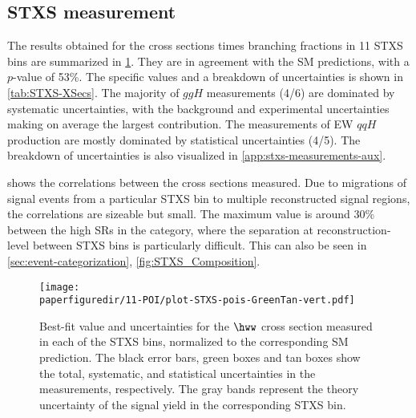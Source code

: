 \subsection{STXS measurement}
The results obtained for the cross sections times branching fractions in 11 STXS bins are summarized in \cref{fig:11-POI_measurement}. 
They are in agreement with the SM predictions, with a $p$-value of 53\%.
The specific values and a breakdown of uncertainties is shown in \cref{tab:STXS-XSecs}. 
The majority of $ggH$ measurements (4/6) are dominated by systematic uncertainties, with the background and experimental uncertainties making on average the largest contribution. 
The measurements of EW $qqH$ production are mostly dominated by statistical uncertainties (4/5). 
The breakdown of uncertainties is also visualized in \cref{app:stxs-measurements-aux}. 

 shows the correlations between the cross sections measured. 
Due to migrations of signal events from a particular STXS bin to multiple reconstructed signal regions, the correlations are sizeable but small. The maximum value is around 30\% between the high \pTH SRs in the \TwoJet category, where the separation at reconstruction-level between STXS bins is particularly difficult. This can also be seen in \cref{sec:event-categorization}, \cref{fig:STXS_Composition}. 

\begin{figure}[htb]
  \centering
  \texttt{[image: \\paperfiguredir/11-POI/plot-STXS-pois-GreenTan-vert.pdf]}
  \caption{
    Best-fit value and uncertainties for the $\hww$ cross section measured in each of the STXS bins, normalized to the corresponding SM prediction.
    The black error bars, green boxes and tan boxes show the total, systematic, and statistical uncertainties in the measurements, respectively.
    The gray bands represent the theory uncertainty of the signal yield in the corresponding STXS bin.
    \label{fig:11-POI_measurement}
  }
\end{figure}

